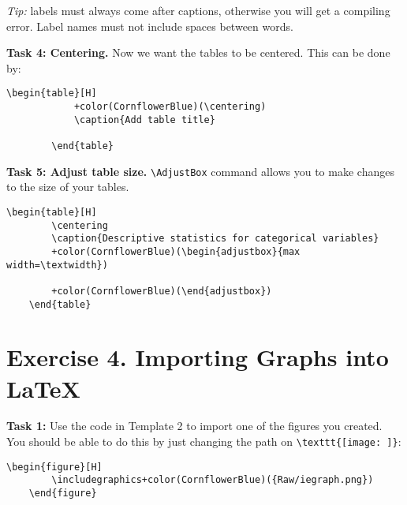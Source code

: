 \documentclass[12pts]{report}
\begin{document}
\begin{center}
	\textcolor{BurntOrange}{\emph{Tip:} labels must always come after captions, otherwise you will get a compiling error. Label names must not include spaces between words.}
\end{center}

\textbf{Task 4: Centering.} Now we want the tables to be centered. This can be done by:

	\begin{Verbatim}[commandchars=+\(\)]
		\begin{table}[H]
			+color(CornflowerBlue)(\centering)
			\caption{Add table title}
			
		\end{table}
	\end{Verbatim}

\textbf{Task 5: Adjust table size.} \verb|\AdjustBox| command allows you to make changes to the size of your tables. 
\begin{Verbatim}[commandchars=+\(\)]
	\begin{table}[H]
		\centering
		\caption{Descriptive statistics for categorical variables}
		+color(CornflowerBlue)(\begin{adjustbox}{max width=\textwidth})  
			
		+color(CornflowerBlue)(\end{adjustbox})
	\end{table}
\end{Verbatim}

\begin{center}
\end{center}

\section*{Exercise 4. Importing Graphs into \LaTeX}

\textbf{Task 1:} Use the code in Template 2 to import one of the figures you created. You should be able to do this by just changing the path on \verb|\texttt{[image: ]}|:
\begin{center}
	\begin{Verbatim}[commandchars=+\(\)]
	\begin{figure}[H]
		\includegraphics+color(CornflowerBlue)({Raw/iegraph.png})
	\end{figure}
	\end{Verbatim}
\end{center}
\end{document}
